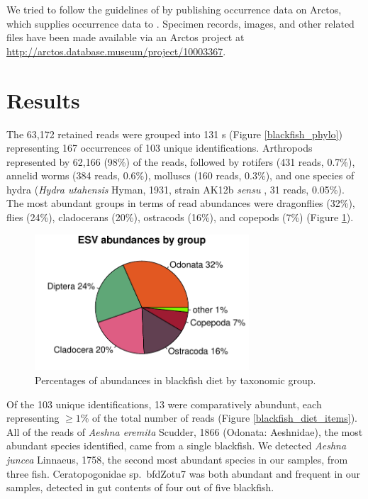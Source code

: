 \begin{multicols}{2}
We tried to follow the guidelines of \citet{Penevetal2017} by publishing occurrence data on Arctos, which supplies occurrence data to . Specimen records, images, and other related files have been made available via an Arctos project at \url{http://arctos.database.museum/project/10003367}.

\section{Results}

The 63,172 retained reads were grouped into 131 s (Figure \ref{blackfish_phylo}) representing 167 occurrences of 103 unique identifications. Arthropods represented by 62,166 (98\%) of the reads, followed by rotifers (431 reads, 0.7\%), annelid worms (384 reads, 0.6\%), molluscs (160 reads, 0.3\%), and one species of hydra (\textit{Hydra utahensis} Hyman, 1931, strain AK12b \textit{sensu} \citet{Martinezetal2010}, 31 reads, 0.05\%). The most abundant groups in terms of read abundances were dragonflies (32\%), flies (24\%), cladocerans (20\%), ostracods (16\%), and copepods (7\%) (Figure \ref{blackfish_pie_chart}).

\begin{figure}[H]
\begin{center}
\vspace{2mm}
\includegraphics[width=8cm]{img/blackfish_pie_chart.pdf}
\caption{Percentages of  abundances in blackfish diet by taxonomic group.}
\label{blackfish_pie_chart}
\end{center}
\end{figure} 

Of the 103 unique identifications, 13 were comparatively abundunt, each representing $\geq 1$\% of the total number of reads (Figure \ref{blackfish_diet_items}). All of the reads of \textit{Aeshna eremita} Scudder, 1866 (Odonata: Aeshnidae), the most abundant species identified, came from a single blackfish. We detected \textit{Aeshna juncea} Linnaeus, 1758, the second most abundant species in our samples, from three fish. Ceratopogonidae sp.\ bfdZotu7 was both abundant and frequent in our samples, detected in gut contents of four out of five blackfish.


\end{multicols}
